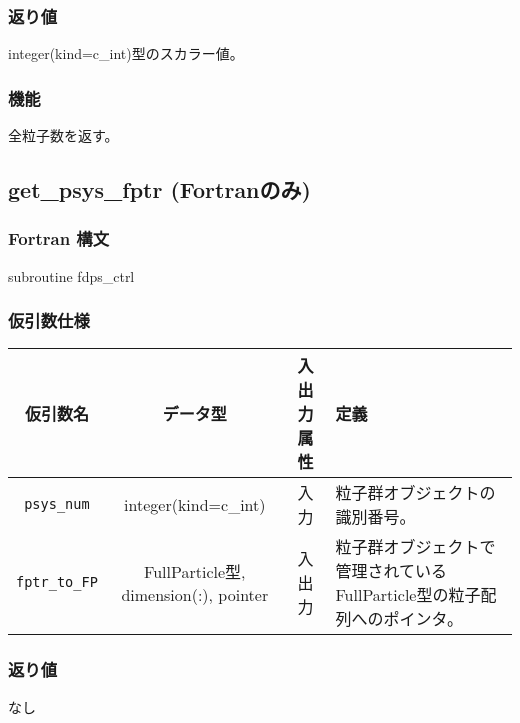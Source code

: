 \subsubsection*{返り値}
integer(kind=c\_int)型のスカラー値。

\subsubsection*{機能}
全粒子数を返す。

\clearpage

\subsection{get\_psys\_fptr {\small (Fortranのみ)}}
\subsubsection*{Fortran 構文}
\begin{screen}
\begin{spverbatim}
subroutine fdps_ctrl%
\end{spverbatim}
\end{screen}

\subsubsection*{仮引数仕様}
\begin{table}[h]
\begin{tabularx}{\linewidth}{cccX}
\toprule
\rowcolor{Snow2}
仮引数名 & データ型 & 入出力属性 & 定義 \\
\midrule
\texttt{psys\_num} & integer(kind=c\_int) & 入力 & 粒子群オブジェクトの識別番号。\\
\texttt{fptr\_to\_FP} & FullParticle型, dimension(:), pointer & 入出力 & 粒子群オブジェクトで管理されているFullParticle型の粒子配列へのポインタ。\\
\bottomrule
\end{tabularx}
\end{table}

\subsubsection*{返り値}
なし

